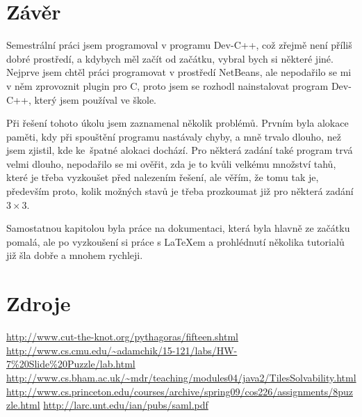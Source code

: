 \documentclass[12pt,titlepage]{article}
\begin{document}
\section{Závěr}
Semestrální práci jsem programoval v programu Dev-C++, což zřejmě není příliš dobré prostředí, a kdybych měl začít od začátku, vybral bych si některé jiné. Nejprve jsem chtěl práci programovat v prostředí NetBeans, ale nepodařilo se mi v něm zprovoznit plugin pro C, proto jsem se rozhodl nainstalovat program Dev-C++, který jsem používal ve škole.
\par
Při řešení tohoto úkolu jsem zaznamenal několik problémů. Prvním byla alokace paměti, kdy při spouštění programu nastávaly chyby, a mně trvalo dlouho, než jsem zjistil, kde ke~špatné alokaci dochází. Pro některá zadání také program trvá velmi dlouho, nepodařilo se mi ověřit, zda je to kvůli velkému množství tahů, které je třeba vyzkoušet před nalezením řešení, ale věřím, že tomu tak je, především proto, kolik možných stavů je třeba prozkoumat již pro některá zadání $3 \times 3$. 
\par
Samostatnou kapitolou byla práce na dokumentaci, která byla hlavně ze začátku pomalá, ale po vyzkoušení si práce s \LaTeX{}em a prohlédnutí několika tutorialů již šla dobře a mnohem rychleji.

\section*{Zdroje}
\url{http://www.cut-the-knot.org/pythagoras/fifteen.shtml}
\newline
\newline
\url{http://www.cs.cmu.edu/~adamchik/15-121/labs/HW-7%20Slide%20Puzzle/lab.html}
\newline
\newline
\url{http://www.cs.bham.ac.uk/~mdr/teaching/modules04/java2/TilesSolvability.html}
\newline
\newline
\url{http://www.cs.princeton.edu/courses/archive/spring09/cos226/assignments/8puzzle.html}
\newline
\newline
\url{http://larc.unt.edu/ian/pubs/saml.pdf}
\end{document}
